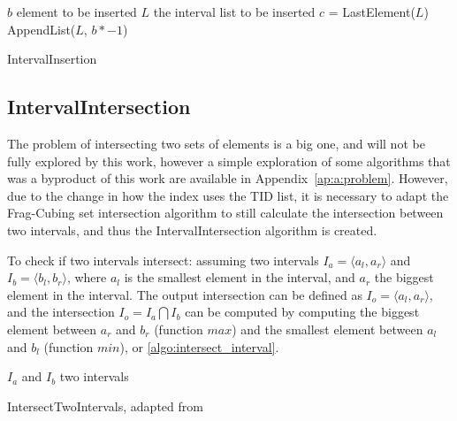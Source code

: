 \begin{algorithm}[!htb]
\SetAlgoLined
{}
 $b$ element to be inserted\;
 $L$ the interval list to be inserted\;
 $c$ = LastElement($L$)\;
 AppendList($L$, $b * - 1$) 
 \caption{IntervalInsertion}\label{algo:interval_insertion}
\end{algorithm}

\subsection{IntervalIntersection}\label{ch:interval:algo:intersection}

The problem of intersecting two sets of elements is a big one, and will not be fully explored by this work, however a simple exploration of some algorithms that was a byproduct of this work are available in Appendix~\ref{ap:a:problem}.
However, due to the change in how the index uses the TID list, it is necessary to adapt the Frag-Cubing set intersection algorithm to still calculate the intersection between two intervals, and thus the IntervalIntersection algorithm is created.

To check if two intervals intersect: assuming two intervals $I_a = \langle a_l, a_r \rangle$ and $I_b = \langle b_l, b_r \rangle$, where $a_l$ is the smallest element in the interval, and $a_r$ the biggest element in the interval.
The output intersection can be defined as $I_o = \langle a_l, a_r \rangle$, and the intersection $I_o = I_a \bigcap I_b$ can be computed by computing the biggest element between $a_r$ and $b_r$ (function $max$) and the smallest element between $a_l$ and $b_l$ (function $min$), or \autoref{algo:intersect_interval}.

\begin{algorithm}[!htb]
\SetAlgoLined
{}
 $I_a$ and $I_b$ two intervals\;
  \caption{IntersectTwoIntervals, adapted from \cite{26260}}\label{algo:intersect_interval}
\end{algorithm}

